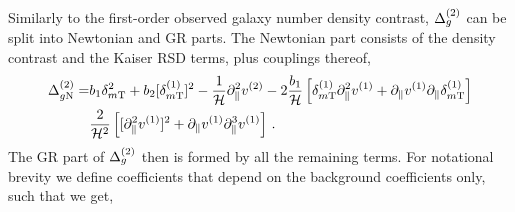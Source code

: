 Similarly to the first-order observed galaxy number density contrast, $\Delta_g^{(2)}$ can be split into Newtonian and GR parts. The Newtonian part consists of the density contrast and the Kaiser RSD terms, plus couplings thereof, 
\begin{align}\label{eq:DeltaSONewt}
	\Delta_{g\mathrm{N}}^{(2)} =& b_1 \delta_{m\mathrm{T}}^2 + b_2 [\delta_{m\mathrm{T}}^{(1)}]^2 - \frac{1}{\mathcal{H}}\partial_\parallel^2 v^{(2)} - 2 \frac{b_1}{\mathcal{H}} \left[ \delta_{m\mathrm{T}}^{(1)} \partial_\parallel^2 v^{(1)} + \partial_\parallel v^{(1)} \partial_\parallel \delta_{m\mathrm{T}}^{(1)} \right] \nonumber \\
	& \frac{2}{\mathcal{H}^2} \left[ [\partial_\parallel^2 v^{(1)}]^2 + \partial_\parallel v^{(1)} \partial_\parallel^3 v^{(1)} \right]\,.
\end{align}
The GR part of $\Delta_g^{(2)}$ then is formed by all the remaining terms. For notational brevity we define coefficients that depend on the background coefficients only, such that we get, 
